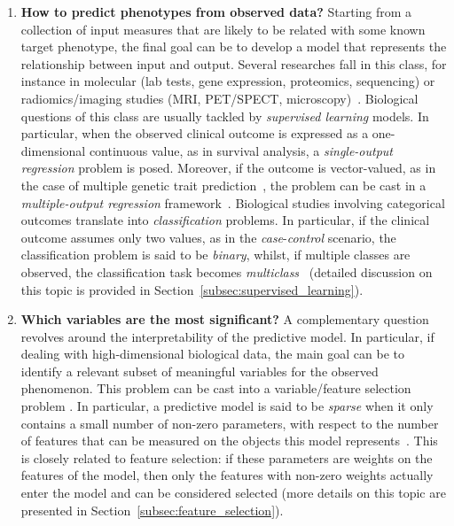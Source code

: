 \begin{enumerate}
	
	\item[] \textbf{How to predict phenotypes from observed data?}
	Starting from a collection of input measures that are likely to be related with some known target phenotype, the final goal can be to develop a model that represents the relationship between input and output. Several researches fall in this class, for instance in molecular (\eg lab tests, gene expression, proteomics, sequencing) \cite{angermueller2016deep, okser2014regularized, abraham2013performance} or radiomics/imaging studies (\eg \ac{MRI}, \ac{PET}/\ac{SPECT}, microscopy)~\cite{min2016deep, helmstaedter2013connectomic}. Biological questions of this class are usually tackled by \textit{supervised learning} models. In particular, when the observed clinical outcome is expressed as a one-dimensional continuous value, as in survival analysis, a \textit{single-output regression} problem is posed. Moreover, if the outcome is vector-valued, as in the case of multiple genetic trait prediction~\cite{he2016novel}, the problem can be cast in a \textit{multiple-output regression }framework~\cite{baldassarre2012multi, argyriou2008convex}. Biological studies involving categorical outcomes translate into \textit{classification} problems. In particular, if the clinical outcome assumes only two values, as in the \textit{case}-\textit{control} scenario, the classification problem is said to be \textit{binary}, whilst, if multiple classes are observed, the classification task becomes \textit{multiclass}~\cite{Yuan2016DeepGeneAA, ancona2005regularized} (detailed discussion on this topic is provided in Section~\ref{subsec:supervised_learning}).
	
	\item[] \textbf{Which variables are the most significant?}
	A complementary question revolves around the interpretability of the predictive model. In particular, if dealing with high-dimensional biological data, the main goal can be to identify a relevant subset of meaningful variables for the observed phenomenon. This problem can be cast into a variable/feature selection problem \cite{guyon2002gene}. %
	In particular, a predictive model is said to be \textit{sparse} when it only contains a small number of non-zero parameters, with respect to the number of features that can be measured on the objects this model represents~\cite{hastie2015statistical, meier2008group}. This is closely related to feature selection: if these parameters are weights on the features of the model, then only the features with non-zero weights actually enter the model and can be considered selected (more details on this topic are presented in Section~\ref{subsec:feature_selection}).
	

\end{enumerate}
